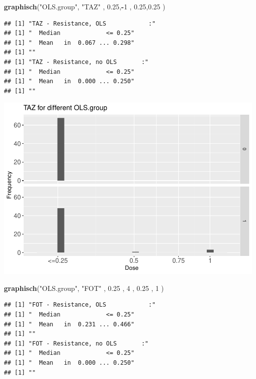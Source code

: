 \documentclass[
]{article}
\newenvironment{Shaded}{\begin{snugshade}}{\end{snugshade}}
\newcommand{\DecValTok}[1]{\textcolor[rgb]{0.00,0.00,0.81}{#1}}
\newcommand{\FloatTok}[1]{\textcolor[rgb]{0.00,0.00,0.81}{#1}}
\newcommand{\KeywordTok}[1]{\textcolor[rgb]{0.13,0.29,0.53}{\textbf{#1}}}
\newcommand{\NormalTok}[1]{#1}
\newcommand{\OperatorTok}[1]{\textcolor[rgb]{0.81,0.36,0.00}{\textbf{#1}}}
\newcommand{\StringTok}[1]{\textcolor[rgb]{0.31,0.60,0.02}{#1}}
\begin{document}
\begin{Shaded}
\begin{Highlighting}[]
  \KeywordTok{graphisch}\NormalTok{(}\StringTok{"OLS.group"}\NormalTok{, }\StringTok{"TAZ"}\NormalTok{ , }\FloatTok{0.25}\NormalTok{,}\OperatorTok{-}\DecValTok{1}\NormalTok{   ,   }\FloatTok{0.25}\NormalTok{,}\FloatTok{0.25}\NormalTok{ )  }
\end{Highlighting}
\end{Shaded}

\begin{verbatim}
## [1] "TAZ - Resistance, OLS            :"
## [1] "  Median             <= 0.25"
## [1] "  Mean   in  0.067 ... 0.298"
## [1] ""
## [1] "TAZ - Resistance, no OLS       :"
## [1] "  Median             <= 0.25"
## [1] "  Mean   in  0.000 ... 0.250"
## [1] ""
\end{verbatim}

\includegraphics{Verteilungen_files/figure-latex/unnamed-chunk-24-1.pdf}

\begin{Shaded}
\begin{Highlighting}[]
  \KeywordTok{graphisch}\NormalTok{(}\StringTok{"OLS.group"}\NormalTok{, }\StringTok{"FOT"}\NormalTok{ , }\FloatTok{0.25}\NormalTok{ ,   }\DecValTok{4}\NormalTok{   ,   }\FloatTok{0.25}\NormalTok{ ,   }\DecValTok{1}\NormalTok{     )  }
\end{Highlighting}
\end{Shaded}

\begin{verbatim}
## [1] "FOT - Resistance, OLS            :"
## [1] "  Median             <= 0.25"
## [1] "  Mean   in  0.231 ... 0.466"
## [1] ""
## [1] "FOT - Resistance, no OLS       :"
## [1] "  Median             <= 0.25"
## [1] "  Mean   in  0.000 ... 0.250"
## [1] ""
\end{verbatim}
\end{document}
